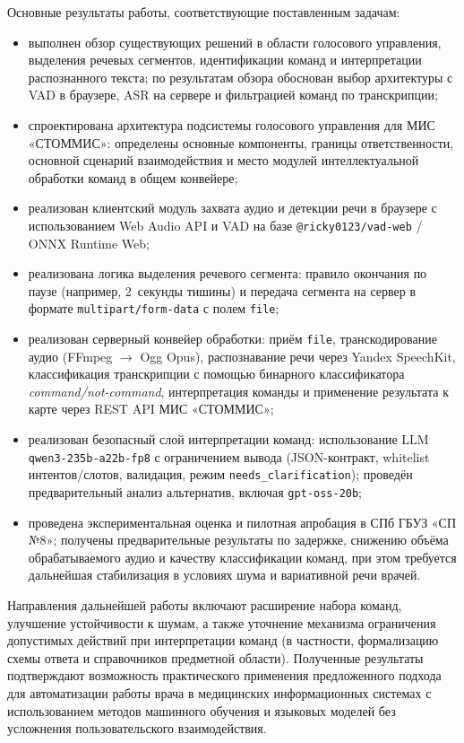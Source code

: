 Основные результаты работы, соответствующие поставленным задачам:
\begin{itemize}
    \item выполнен обзор существующих решений в области голосового управления, выделения речевых сегментов, идентификации команд и интерпретации распознанного текста; по результатам обзора обоснован выбор архитектуры с VAD в браузере, ASR на сервере и фильтрацией команд по транскрипции;
    \item спроектирована архитектура подсистемы голосового управления для МИС «СТОММИС»: определены основные компоненты, границы ответственности, основной сценарий взаимодействия и место модулей интеллектуальной обработки команд в общем конвейере;
    \item реализован клиентский модуль захвата аудио и детекции речи в браузере с использованием Web Audio API и VAD на базе \texttt{@ricky0123/vad-web} / ONNX Runtime Web;
    \item реализована логика выделения речевого сегмента: правило окончания по паузе (например, 2~секунды тишины) и передача сегмента на сервер в формате \texttt{multipart/form-data} с полем \texttt{file};
    \item реализован серверный конвейер обработки: приём \texttt{file}, транскодирование аудио (FFmpeg $\rightarrow$ Ogg Opus), распознавание речи через Yandex SpeechKit, классификация транскрипции с помощью бинарного классификатора \textit{command/not-command}, интерпретация команды и применение результата к карте через REST API МИС «СТОММИС»;
    \item реализован безопасный слой интерпретации команд: использование LLM \texttt{qwen3-235b-a22b-fp8} с ограничением вывода (JSON-контракт, whitelist интентов/слотов, валидация, режим \texttt{needs\_clarification}); проведён предварительный анализ альтернатив, включая \texttt{gpt-oss-20b};
    \item проведена экспериментальная оценка и пилотная апробация в СПб ГБУЗ «СП №8»; получены предварительные результаты по задержке, снижению объёма обрабатываемого аудио и качеству классификации команд, при этом требуется дальнейшая стабилизация в условиях шума и вариативной речи врачей.
\end{itemize}

Направления дальнейшей работы включают расширение набора команд, улучшение устойчивости к шумам, а также уточнение механизма ограничения допустимых действий при интерпретации команд (в частности, формализацию схемы ответа и справочников предметной области).
Полученные результаты подтверждают возможность практического применения предложенного подхода для автоматизации работы врача в медицинских информационных системах с использованием методов машинного обучения и языковых моделей
без усложнения пользовательского взаимодействия.

